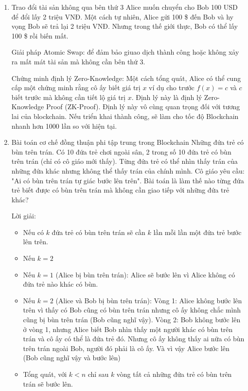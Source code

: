 \documentclass[14pt, a4paper]{article}
\numberwithin{equation}{section}
\numberwithin{figure}{section}
\numberwithin{dl}{section}
\numberwithin{md}{section}
\numberwithin{bd}{section}
\numberwithin{dn}{section}
\numberwithin{hq}{section}
\begin{document}
    \begin{enumerate}
        \item Trao đổi tài sản không qua bên thứ 3
        Alice muốn chuyển cho Bob 100 USD để đổi lấy 2 triệu VNĐ.
        Một cách tự nhiên, Alice gửi 100 \$ đến Bob và hy vọng Bob sẽ trả lại 2 triệu VNĐ.
        Nhưng trong thế giới thực, Bob có thể lấy 100 \$ rồi biến mất.

        Giải pháp Atomic Swap: để đảm bảo giuao dịch thành công hoặc không xảy ra mất mát tài sản mà không cần bên thứ 3.

        Chứng minh định lý Zero-Knowledge: Một cách tổng quát, Alice có thể cung cấp một chứng minh rằng cô ấy biết giá trị $x$ ví dụ cho trước $f(x)=c$ và $c$ biết trước mà không cần tiết lộ giá trị $x$.
        Định lý này là định lý Zero-Knowledge Proof (ZK-Proof).
        Định lý này vô cùng quan trọng đối với tương lai của blockchain.
        Nếu triển khai thành công, sẽ làm cho tốc độ Blockchain nhanh hơn 1000 lần so với hiện tại.

        \item Bài toán cơ chế đồng thuận phi tập trung trong Blockchain
        Những đứa trẻ có bùn trên trán. Có 10 đứa trẻ chơi ngoài sân, 2 trong số 10 đứa trẻ có bùn trên trán (chỉ có cô giáo mới thấy). Từng đứa trẻ có thể nhìn thấy trán của những đứa khác nhưng không thể thấy trán của chính mình.
        Cô giáo yêu cầu: "Ai có bùn trên trán tự giác bước lên trên". Bài toán là làm thế nào từng đứa trẻ biết được có bùn trên trán mà không cần giao tiếp với những đứa trẻ khác?

        Lời giải: 
        \begin{itemize}
            \item Nếu có $k$ đứa trẻ có bùn trên trán sẽ cần $k$ lần mỗi lần một đứa trẻ bước lên trên.
            \item Nếu $k=2$
        \end{itemize}

        \begin{itemize}
            \item Nếu $k=1$ (Alice bị bùn trên trán): Alice sẽ bước lên vì Alice không có đứa trẻ nào khác có bùn.
            \item Nếu $k=2$ (Alice và Bob bị bùn trên trán): Vòng 1: Alice không bước lên trên vì thấy có Bob cũng có bùn trên trán nhưng cô ấy không chắc mình cũng bị bùn trên trán (Bob cũng nghĩ vậy).
            Vòng 2: Bob không bước lên ở vòng 1, nhưng Alice biết Bob nhìn thấy một người khác có bùn trên trán và cô ấy có thể là đứa trẻ đó. Nhưng cô ấy không thấy ai nữa có bùn trên trán ngoài Bob, người đó phải là cô ấy. Và vì vậy Alice bước lên (Bob cũng nghĩ vậy và bước lên)
            \item Tổng quát, với $k < n$ chỉ sau $k$ vòng tất cả những đứa trẻ có bùn trên trán sẽ bước lên.
        \end{itemize}


\end{enumerate}
\end{document}
